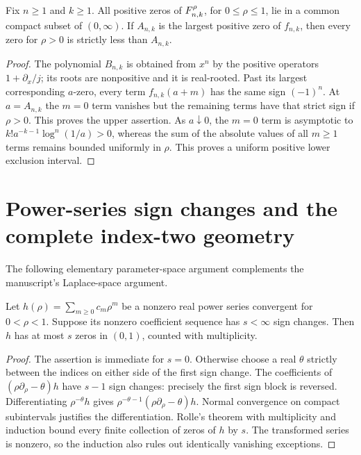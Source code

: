 \begin{lemma}\label{lerchbd:lem:compact}
Fix $n\ge1$ and $k\ge1$. All positive zeros of $F_{n,k}^{\rho}$, for $0\le\rho\le1$, lie in a common compact subset of $(0,\infty)$. If $A_{n,k}$ is the largest positive zero of $f_{n,k}$, then every zero for $\rho>0$ is strictly less than $A_{n,k}$.
\end{lemma}
\begin{proof}
The polynomial $B_{n,k}$ is obtained from $x^n$ by the positive operators $1+\partial_x/j$; its roots are nonpositive and it is real-rooted. Past its largest corresponding $a$-zero, every term $f_{n,k}(a+m)$ has the same sign $(-1)^n$. At $a=A_{n,k}$ the $m=0$ term vanishes but the remaining terms have that strict sign if $\rho>0$. This proves the upper assertion. As $a\downarrow0$, the $m=0$ term is asymptotic to $k!a^{-k-1}\log^n(1/a)>0$, whereas the sum of the absolute values of all $m\ge1$ terms remains bounded uniformly in $\rho$. This proves a uniform positive lower exclusion interval.
\end{proof}

\section{Power-series sign changes and the complete index-two geometry}\label{lerchbd:sec:n2}
The following elementary parameter-space argument complements the manuscript's Laplace-space argument.

\begin{lemma}\label{lerchbd:lem:descartes}
Let $h(\rho)=\sum_{m\ge0}c_m\rho^m$ be a nonzero real power series convergent for $0<\rho<1$. Suppose its nonzero coefficient sequence has $s<\infty$ sign changes. Then $h$ has at most $s$ zeros in $(0,1)$, counted with multiplicity.
\end{lemma}
\begin{proof}
The assertion is immediate for $s=0$. Otherwise choose a real $\theta$ strictly between the indices on either side of the first sign change. The coefficients of
$(\rho\partial_\rho-\theta)h$ have $s-1$ sign changes: precisely the first sign block is reversed. Differentiating $\rho^{-\theta}h$ gives $\rho^{-\theta-1}(\rho\partial_\rho-\theta)h$. Normal convergence on compact subintervals justifies the differentiation. Rolle's theorem with multiplicity and induction bound every finite collection of zeros of $h$ by $s$. The transformed series is nonzero, so the induction also rules out identically vanishing exceptions.
\end{proof}

